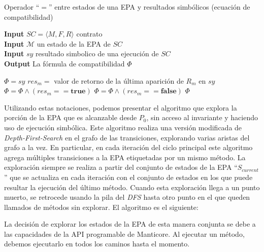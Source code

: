 \begin{algorithm}[H]
    \captionsetup{belowskip=0pt}
    \caption{Operador ``$=$'' entre estados de una EPA y resultados simbólicos (ecuación de compatibilidad)}
    \hspace*{\algorithmicindent} \textbf{Input} $SC = \langle M, F, R \rangle$ contrato \\
    \hspace*{\algorithmicindent} \textbf{Input} $\mathcal{M}$ un estado de la EPA de $SC$ \\
    \hspace*{\algorithmicindent} \textbf{Input} $sy$ resultado simbolico de una ejecución de $SC$ \\
    \hspace*{\algorithmicindent} \textbf{Output} La fórmula de compatibilidad $\Phi$
    \begin{algorithmic}[1]
        \State $\Phi = sy$
        \State $res_m =$ valor de retorno de la última aparición de $R_m$ en $sy$
        \State $\Phi = \Phi \land (res_m == \textbf{true})$
        \Else
        \State $\Phi = \Phi \land (res_m == \textbf{false})$
        \EndIf
        \EndFor
        \State \Return $\Phi$
    \end{algorithmic}
\end{algorithm}

Utilizando estas notaciones, podemos presentar el algoritmo que explora la porción de la EPA que es alcanzable desde $P_0$, sin acceso al invariante y haciendo uso de ejecución simbólica.
Este algoritmo realiza una versión	modificada de \textit{Depth-First-Search} en el grafo de las transiciones, explorando varias aristas del grafo a la vez.
En particular, en cada iteración del ciclo principal este algoritmo agrega múltiples transiciones a la EPA etiquetadas por un mismo método.
La exploración siempre se realiza a partir del conjunto de estados de la EPA ``$S_{current}$'' que se actualiza en cada iteración con el conjunto de estados en los que puede resultar la ejecución del último método.
Cuando esta exploración llega a un punto muerto, se retrocede usando la pila del \textit{DFS} hasta otro punto en el que queden llamados de métodos sin explorar.
El algoritmo es el siguiente:


%    
La decisión de explorar los estados de la EPA de esta manera conjunta se debe a las capacidades de la API programable de Manticore.
Al ejecutar un método, debemos ejecutarlo en todos los caminos hasta el momento.

